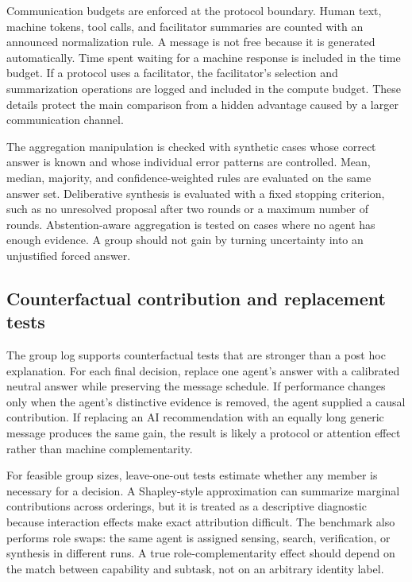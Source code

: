 \documentclass[conference]{IEEEtran}
\begin{document}
Communication budgets are enforced at the protocol boundary. Human text, machine tokens, tool calls, and facilitator summaries are counted with an announced normalization rule. A message is not free because it is generated automatically. Time spent waiting for a machine response is included in the time budget. If a protocol uses a facilitator, the facilitator's selection and summarization operations are logged and included in the compute budget. These details protect the main comparison from a hidden advantage caused by a larger communication channel.

The aggregation manipulation is checked with synthetic cases whose correct answer is known and whose individual error patterns are controlled. Mean, median, majority, and confidence-weighted rules are evaluated on the same answer set. Deliberative synthesis is evaluated with a fixed stopping criterion, such as no unresolved proposal after two rounds or a maximum number of rounds. Abstention-aware aggregation is tested on cases where no agent has enough evidence. A group should not gain by turning uncertainty into an unjustified forced answer.

\subsection{Counterfactual contribution and replacement tests}

The group log supports counterfactual tests that are stronger than a post hoc explanation. For each final decision, replace one agent's answer with a calibrated neutral answer while preserving the message schedule. If performance changes only when the agent's distinctive evidence is removed, the agent supplied a causal contribution. If replacing an AI recommendation with an equally long generic message produces the same gain, the result is likely a protocol or attention effect rather than machine complementarity.

For feasible group sizes, leave-one-out tests estimate whether any member is necessary for a decision. A Shapley-style approximation can summarize marginal contributions across orderings, but it is treated as a descriptive diagnostic because interaction effects make exact attribution difficult. The benchmark also performs role swaps: the same agent is assigned sensing, search, verification, or synthesis in different runs. A true role-complementarity effect should depend on the match between capability and subtask, not on an arbitrary identity label.
\end{document}
